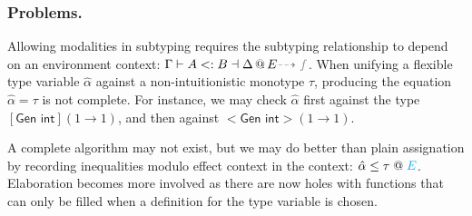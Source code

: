 \documentclass[a4paper,11pt]{article}
\makeatletter
\newcommand{\subt}{ <: }
\newcommand{\ectx}[1]{\;@\;{\color{cyan} #1}}
\makeatother
\begin{document}
\subsubsection{Problems.}
Allowing modalities in subtyping requires the subtyping relationship to depend
on an environment context: $\Gamma\vdash A\subt B \dashv \Delta \, @ \,E
{\color{gray} \dashrightarrow f}$. When unifying a flexible type variable
$\hat{\alpha}$ against a non-intuitionistic monotype $\tau$, producing the
equation $\hat{\alpha}=\tau$ is not complete. For instance, we may check
$\hat{\alpha}$ first against the type $[\textsf{Gen int}](1\to1)$, and then
against $<\textsf{Gen int}>(1\to1)$.

A complete algorithm may not exist, but we may do better than plain assignation
by recording inequalities modulo effect context in the context:
$\hat{\alpha}\leq \tau\ectx{E}$. Elaboration becomes more involved as there are
now holes with functions that can only be filled when a definition for the type
variable is chosen.
\end{document}
